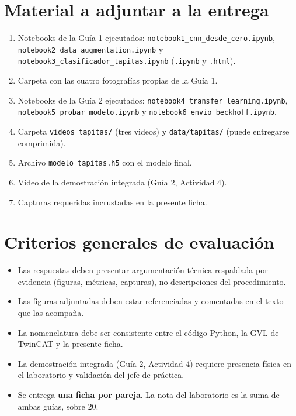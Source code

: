 \section*{Material a adjuntar a la entrega}

\begin{enumerate}
\item Notebooks de la Guía 1 ejecutados: \texttt{notebook1\_cnn\_desde\_cero.ipynb}, \texttt{notebook2\_data\_augmentation.ipynb} y \texttt{notebook3\_clasificador\_tapitas.ipynb} (\texttt{.ipynb} y \texttt{.html}).
\item Carpeta con las cuatro fotografías propias de la Guía 1.
\item Notebooks de la Guía 2 ejecutados: \texttt{notebook4\_transfer\_learning.ipynb}, \texttt{notebook5\_probar\_modelo.ipynb} y \texttt{notebook6\_envio\_beckhoff.ipynb}.
\item Carpeta \texttt{videos\_tapitas/} (tres videos) y \texttt{data/tapitas/} (puede entregarse comprimida).
\item Archivo \texttt{modelo\_tapitas.h5} con el modelo final.
\item Video de la demostración integrada (Guía 2, Actividad 4).
\item Capturas requeridas incrustadas en la presente ficha.
\end{enumerate}

\section*{Criterios generales de evaluación}

\begin{itemize}
\item Las respuestas deben presentar argumentación técnica respaldada por evidencia (figuras, métricas, capturas), no descripciones del procedimiento.
\item Las figuras adjuntadas deben estar referenciadas y comentadas en el texto que las acompaña.
\item La nomenclatura debe ser consistente entre el código Python, la GVL de TwinCAT y la presente ficha.
\item La demostración integrada (Guía 2, Actividad 4) requiere presencia física en el laboratorio y validación del jefe de práctica.
\item Se entrega \textbf{una ficha por pareja}. La nota del laboratorio es la suma de ambas guías, sobre 20.
\end{itemize}


